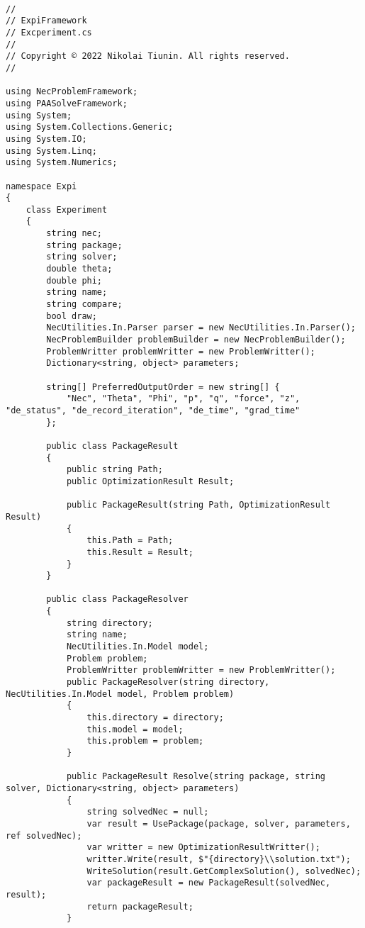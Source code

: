 \documentclass{scrartcl}
\begin{document}
\begin{lstlisting}[language={[Sharp]C}, caption={Experiment}, label={experiment}]

//
// ExpiFramework
// Excperiment.cs
//
// Copyright © 2022 Nikolai Tiunin. All rights reserved.
//

using NecProblemFramework;
using PAASolveFramework;
using System;
using System.Collections.Generic;
using System.IO;
using System.Linq;
using System.Numerics;

namespace Expi
{
    class Experiment
    {
        string nec;
        string package;
        string solver;
        double theta;
        double phi;
        string name;
        string compare;
        bool draw;
        NecUtilities.In.Parser parser = new NecUtilities.In.Parser();
        NecProblemBuilder problemBuilder = new NecProblemBuilder();
        ProblemWritter problemWritter = new ProblemWritter();
        Dictionary<string, object> parameters;

        string[] PreferredOutputOrder = new string[] {
            "Nec", "Theta", "Phi", "p", "q", "force", "z", "de_status", "de_record_iteration", "de_time", "grad_time"
        };

        public class PackageResult
        {
            public string Path;
            public OptimizationResult Result;

            public PackageResult(string Path, OptimizationResult Result)
            {
                this.Path = Path;
                this.Result = Result;
            }
        }

        public class PackageResolver
        {
            string directory;
            string name;
            NecUtilities.In.Model model;
            Problem problem;
            ProblemWritter problemWritter = new ProblemWritter();
            public PackageResolver(string directory, NecUtilities.In.Model model, Problem problem)
            {
                this.directory = directory;
                this.model = model;
                this.problem = problem;
            }

            public PackageResult Resolve(string package, string solver, Dictionary<string, object> parameters)
            {
                string solvedNec = null;
                var result = UsePackage(package, solver, parameters, ref solvedNec);
                var writter = new OptimizationResultWritter();
                writter.Write(result, $"{directory}\\solution.txt");
                WriteSolution(result.GetComplexSolution(), solvedNec);
                var packageResult = new PackageResult(solvedNec, result);
                return packageResult;
            }


\end{lstlisting}
\end{document}
